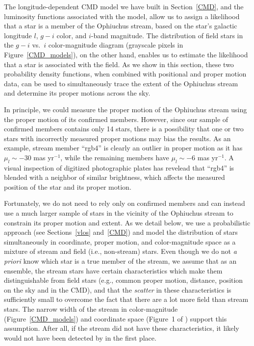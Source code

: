 \documentclass[iop]{emulateapj}
\begin{document}
The longitude-dependent CMD model we have built in Section~\ref{CMD}, and the
luminosity functions associated with the model, allow us to assign a likelihood
that a star is a member of the Ophiuchus stream, based on the star's galactic
longitude $l$, $g-i$ color, and $i$-band magnitude. The distribution of field
stars in the $g-i$ vs.~$i$ color-magnitude diagram (grayscale pixels in
Figure~\ref{CMD_models}), on the other hand, enables us to estimate the
likelihood that a star is associated with the field. As we show in this section,
these two probability density functions, when combined with positional and
proper motion data, can be used to simultaneously trace the extent of the
Ophiuchus stream and determine its proper motions across the sky.

In principle, we could measure the proper motion of the Ophiuchus stream using
the proper motion of its confirmed members. However, since our sample of
confirmed members contains only 14 stars, there is a possibility that one or two
stars with incorrectly measured proper motions may bias the results. As an
example, stream member ``rgb4'' is clearly an outlier in proper motion as it has
$\mu_l\sim-30$ mas yr$^{-1}$, while the remaining members have $\mu_l\sim-6$ mas
yr$^{-1}$. A visual inspection of digitized photographic plates has revelead
that ``rgb4'' is blended with a neighbor of similar brightness, which affects
the measured position of the star and its proper motion.

Fortunately, we do not need to rely only on confirmed members and can instead
use a much larger sample of stars in the vicinity of the Ophiuchus stream to
constrain its proper motion and extent. As we detail below, we use a
probabilistic approach (see Sections~\ref{vlos} and~\ref{CMD}) and model the
distribution of stars simultaneously in coordinate, proper motion, and
color-magnitude space as a mixture of stream and field (i.e., non-stream) stars.
Even though we do not {\em a priori} know which star is a true member of the
stream, we assume that as an ensemble, the stream stars have certain
characteristics which make them distinguishable from field stars (e.g., common
proper motion, distance, position on the sky and in the CMD), and that the
{\em scatter} in these characteristics is sufficiently small to overcome the
fact that there are a lot more field than stream stars. The narrow width of
the stream in color-magnitude (Figure~\ref{CMD_models}) and coordinate space
(Figure~1 of \citealt{ber14b}) support this assumption. After all, if the stream
did not have these characteristics, it likely would not have been detected by
\citet{ber14b} in the first place.
\end{document}
